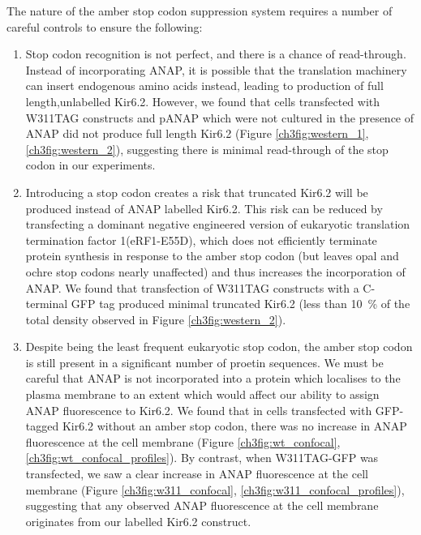 The nature of the amber stop codon suppression system requires a number of careful controls to ensure the following:

\begin{enumerate}
	\item Stop codon recognition is not perfect, and there is a chance of read-through.
	Instead of incorporating ANAP, it is possible that the translation machinery can insert endogenous amino acids instead, leading to production of full length,unlabelled Kir6.2.
	However, we found that cells transfected with W311TAG constructs and pANAP which were not cultured in the presence of ANAP did not produce full length Kir6.2 (Figure \ref{ch3fig:western_1}, \ref{ch3fig:western_2}), suggesting there is minimal read-through of the stop codon in our experiments.
	\item Introducing a stop codon creates a risk that truncated Kir6.2 will be produced instead of ANAP labelled Kir6.2.
	This risk can be reduced by transfecting a dominant negative engineered version of eukaryotic translation termination factor 1(eRF1-E55D), which does not efficiently terminate protein synthesis in response to the amber stop codon (but leaves opal and ochre stop codons nearly unaffected) and thus increases the incorporation of ANAP.
	We found that transfection of W311TAG constructs with a C-terminal GFP tag produced minimal truncated Kir6.2 (less than \SI{10}{\percent} of the total density observed in Figure \ref{ch3fig:western_2}).
	\item Despite being the least frequent eukaryotic stop codon, the amber stop codon is still present in a significant number of proetin sequences.
	We must be careful that ANAP is not incorporated into a protein which localises to the plasma membrane to an extent which would affect our ability to assign ANAP fluorescence to Kir6.2.
	We found that in cells transfected with GFP-tagged Kir6.2 without an amber stop codon, there was no increase in ANAP fluorescence at the cell membrane (Figure \ref{ch3fig:wt_confocal}, \ref{ch3fig:wt_confocal_profiles}).
	By contrast, when W311TAG-GFP was transfected, we saw a clear increase in ANAP fluorescence at the cell membrane (Figure \ref{ch3fig:w311_confocal}, \ref{ch3fig:w311_confocal_profiles}), suggesting that any observed ANAP fluorescence at the cell membrane originates from our labelled Kir6.2 construct.
\end{enumerate}

